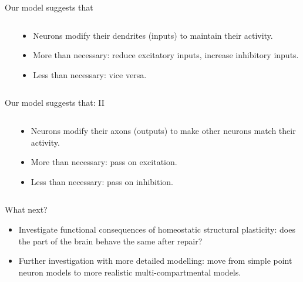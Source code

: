 \begin{frame}[c]{Our model suggests that}
  \begin{columns}
    \begin{column}{0.5\textwidth}
      \centering
      
    \end{column}
    \begin{column}{0.5\textwidth}
      \begin{itemize}
        \item Neurons modify their \alert{dendrites (inputs)} to maintain their activity.
          \pause{}
        \item More than necessary: reduce excitatory inputs, increase inhibitory inputs.
        \item Less than necessary: vice versa.
      \end{itemize}
    \end{column}
  \end{columns}
\end{frame}
\begin{frame}[c]{Our model suggests that: II}
  \begin{columns}
    \begin{column}{0.5\textwidth}
      \centering
      
    \end{column}
    \begin{column}{0.5\textwidth}
      \begin{itemize}
        \item Neurons modify their \alert{axons (outputs)} to make other neurons match their activity.
          \pause{}
        \item More than necessary: pass on excitation.
        \item Less than necessary: pass on inhibition.
      \end{itemize}
    \end{column}
  \end{columns}
\end{frame}
\begin{frame}[c]{What next?}
  \begin{itemize}
    \item Investigate \alert{functional consequences} of homeostatic structural plasticity: does the part of the brain behave the same after repair?
      \pause{}
    \item \alert{Further investigation} with more detailed modelling: move from simple point neuron models to more realistic multi-compartmental models.
  \end{itemize}
\end{frame}
